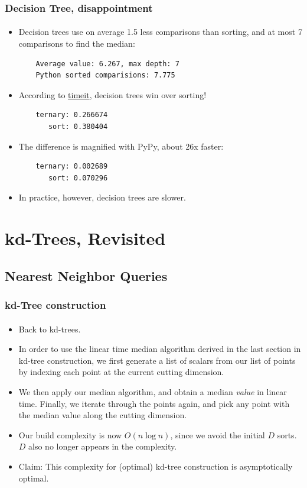\documentclass{beamer}                             %
\begin{document}
\begin{frame}[fragile]
\frametitle{Decision Tree, disappointment}
\framesubtitle{}
\begin{itemize}
  \item Decision trees use on average 1.5 less comparisons than
    sorting, and at most 7 comparisons to find the median:
    \begin{verbatim}
    Average value: 6.267, max depth: 7
    Python sorted comparisions: 7.775
    \end{verbatim}
  \item According to
    \href{https://docs.python.org/3/library/timeit.html}{timeit},
    decision trees win over sorting!
    \begin{verbatim}
    ternary: 0.266674
       sort: 0.380404
    \end{verbatim}
  \item The difference is magnified with PyPy, about 26x faster:
    \begin{verbatim}
    ternary: 0.002689
       sort: 0.070296
    \end{verbatim}
  \item In practice, however, decision trees are slower.
\end{itemize}
\end{frame}

\section{kd-Trees, Revisited}
\subsection{Nearest Neighbor Queries}

\begin{frame}
\frametitle{kd-Tree construction}
\framesubtitle{}
\begin{itemize}
  \item Back to kd-trees.
  \item In order to use the linear time median algorithm derived in the last
    section in kd-tree construction, we first generate a list of scalars from
    our list of points by indexing each point at the current cutting dimension.
  \item We then apply our median algorithm, and obtain a median \emph{value}
    in linear time. Finally, we iterate through the points again, and pick
    any point with the median value along the cutting dimension. \pause
  \item Our build complexity is now \( O(n \log n) \), since we avoid the
    initial \( D \) sorts. \( D \) also no longer appears in the complexity.
  \item Claim: This complexity for (optimal)
    kd-tree construction is asymptotically optimal.
\end{itemize}
\end{frame}
\end{document}
